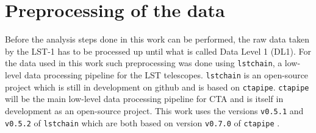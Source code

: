 \chapter{Preprocessing of the data}
\label{ch:prepro}

Before the analysis steps done in this work can be performed, the raw data taken by the LST-1 has to be processed up until what is called Data Level 1 (DL1).
For the data used in this work such preprocessing was done using \texttt{lstchain}, a low-level data processing pipeline for the LST telescopes. 
\texttt{lstchain} is an open-source project which is still in development on github \cite{lstchain} and is based on \texttt{ctapipe}. 
\texttt{ctapipe} will be the main low-level data processing pipeline for CTA and is itself in development as an open-source project.
This work uses the versions \texttt{v0.5.1} and \texttt{v0.5.2} of \texttt{lstchain} which are both based on version \texttt{v0.7.0} of \texttt{ctapipe} \cite{ctapipe}. 

